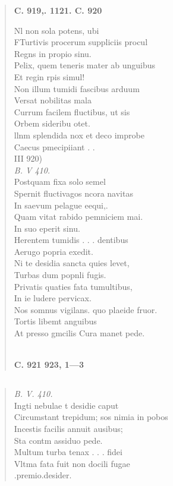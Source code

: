 \documentclass[11pt, a4paper]{report}
\begin{document}
\begin{verse}
     \marginpar{[346]} \begin{center} \textbf{C. 919,. 1121. C. 920} \end{center}Nl non sola potens, ubi \\ FTurtivis procerum suppliciis procul \\ Regns in propio sinu. \\ Pelix, quem teneris mater ab unguibus \\ Et regin rpis simul! \\ Non illum  \lbrack tumidi \rbrack  fascibus arduum \\ Versat nobilitas mala \\ Currum facilem fluctibus, ut sis \\ Orbem sideribu otet. \\ llnm splendida nox et deco improbe \\ Caecus pmecipiiant . . \\ III 920) \\ \textit{B. V 410.} \\ Postquam fixa solo semel \\ Spernit fluctivagos ncora navitas \\ In saevum pelague eequi,. \\ Quam vitat rabido pemniciem mai. \\ In suo eperit sinu. \\ Herentem tumidis . . . dentibus \\ Aerugo popria exedit. \\ Ni te desidia sancta quies levet, \\ Turbas dum popnli fugis. \\ Privatis quaties fata tumultibus, \\ In ie ludere pervicax. \\ Nos somnus vigilans.  \lbrack quo plaeide \rbrack  fruor. \\ Tortis libemt anguibus \\ At presso gmcilis Cura manet pede. \\ 
        ﻿\pagebreak 
    \begin{center} \textbf{C. 921 923, 1—3} \end{center}
      \end{verse}
  
            \subsection*{}
      \begin{verse}
      \textit{B. V. 410.} \\ Ingti nebulae t desidie caput \\ Circumstant trepidum; sos nimia in pobos \\ Incestis facilis annuit ausibus; \\ Sta contm assiduo pede. \\ Multum turba tenax . . . fidei \\ Vltma fata fuit non docili fugae \\ .premio.desider. \\ 
      \end{verse}
  
\end{document}
